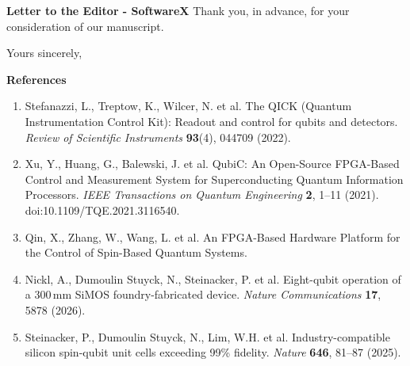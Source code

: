 \documentclass[11pt]{letter}
\begin{document}
\begin{letter}{\textbf{Letter to the Editor - SoftwareX}}
Thank you, in advance, for your consideration of our manuscript.

\closing{Yours sincerely,}

\end{letter}
\newpage

\vspace{1em}
\noindent\textbf{References}

\begin{enumerate}
\item Stefanazzi, L., Treptow, K., Wilcer, N. et al.
The QICK (Quantum Instrumentation Control Kit): Readout and
control for qubits and detectors.
\emph{Review of Scientific Instruments} \textbf{93}(4),
044709 (2022).

\item Xu, Y., Huang, G., Balewski, J. et al.
QubiC: An Open-Source FPGA-Based Control and Measurement
System for Superconducting Quantum Information Processors.
\emph{IEEE Transactions on Quantum Engineering} \textbf{2},
1--11 (2021).
doi:10.1109/TQE.2021.3116540.

\item Qin, X., Zhang, W., Wang, L. et al.
An FPGA-Based Hardware Platform for the Control of Spin-Based
Quantum Systems.

\item Nickl, A., Dumoulin Stuyck, N., Steinacker, P. et al.
Eight-qubit operation of a 300\,mm SiMOS foundry-fabricated device.
\emph{Nature Communications} \textbf{17}, 5878 (2026).

\item Steinacker, P., Dumoulin Stuyck, N., Lim, W.H. et al.
Industry-compatible silicon spin-qubit unit cells exceeding 99\% fidelity.
\emph{Nature} \textbf{646}, 81--87 (2025).
\end{enumerate}
\end{document}
